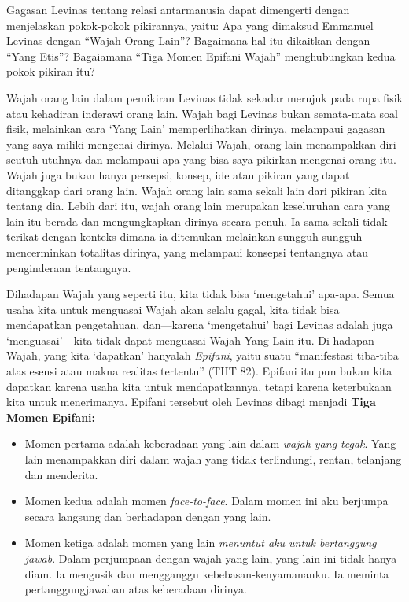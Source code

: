 \documentclass[11pt,twoside,a5paper,openany]{memoir}
\def\tightlist{}
\begin{document}
Gagasan Levinas tentang relasi antarmanusia dapat dimengerti dengan
menjelaskan pokok-pokok pikirannya, yaitu: Apa yang dimaksud Emmanuel
Levinas dengan ``Wajah Orang Lain''? Bagaimana hal itu dikaitkan dengan
``Yang Etis''? Bagaiamana ``Tiga Momen Epifani Wajah'' menghubungkan
kedua pokok pikiran itu?

Wajah orang lain dalam pemikiran Levinas tidak sekadar merujuk pada rupa
fisik atau kehadiran inderawi orang lain. Wajah bagi Levinas bukan
semata-mata soal fisik, melainkan cara `Yang Lain' memperlihatkan
dirinya, melampaui gagasan yang saya miliki mengenai dirinya. Melalui
Wajah, orang lain menampakkan diri seutuh-utuhnya dan melampaui apa yang
bisa saya pikirkan mengenai orang itu. Wajah juga bukan hanya persepsi,
konsep, ide atau pikiran yang dapat ditanggkap dari orang lain. Wajah
orang lain sama sekali lain dari pikiran kita tentang dia. Lebih dari
itu, wajah orang lain merupakan keseluruhan cara yang lain itu berada
dan mengungkapkan dirinya secara penuh. Ia sama sekali tidak terikat
dengan konteks dimana ia ditemukan melainkan sungguh-sungguh
mencerminkan totalitas dirinya, yang melampaui konsepsi tentangnya atau
penginderaan tentangnya.

Dihadapan Wajah yang seperti itu, kita tidak bisa `mengetahui' apa-apa.
Semua usaha kita untuk menguasai Wajah akan selalu gagal, kita tidak
bisa mendapatkan pengetahuan, dan---karena `mengetahui' bagi Levinas
adalah juga `menguasai'---kita tidak dapat menguasai Wajah Yang Lain
itu. Di hadapan Wajah, yang kita `dapatkan' hanyalah \emph{Epifani},
yaitu suatu ``manifestasi tiba-tiba atas esensi atau makna realitas
tertentu'' (THT 82). Epifani itu pun bukan kita dapatkan karena usaha
kita untuk mendapatkannya, tetapi karena keterbukaan kita untuk
menerimanya. Epifani tersebut oleh Levinas dibagi menjadi \textbf{Tiga
Momen Epifani:}

\begin{itemize}
\tightlist
\item
  Momen pertama adalah keberadaan yang lain dalam \emph{wajah yang
  tegak}. Yang lain menampakkan diri dalam wajah yang tidak terlindungi,
  rentan, telanjang dan menderita.
\item
  Momen kedua adalah momen \emph{face-to-face}. Dalam momen ini aku
  berjumpa secara langsung dan berhadapan dengan yang lain.
\item
  Momen ketiga adalah momen yang lain \emph{menuntut aku untuk
  bertanggung jawab}. Dalam perjumpaan dengan wajah yang lain, yang lain
  ini tidak hanya diam. Ia mengusik dan mengganggu
  kebebasan-kenyamananku. Ia meminta pertanggungjawaban atas keberadaan
  dirinya.
\end{itemize}
\end{document}
